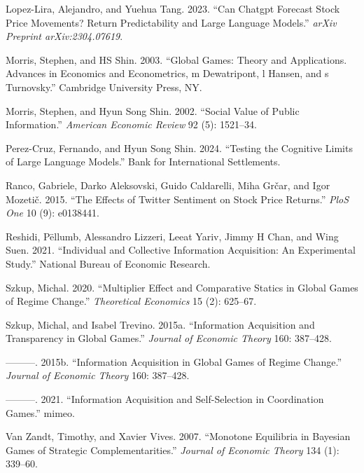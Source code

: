 \documentclass[
]{article}
\newlength{\cslhangindent}
\newenvironment{CSLReferences}[2] %
 {\begin{list}{}{%
  \setlength{\itemindent}{0pt}
  \setlength{\leftmargin}{0pt}
  \setlength{\parsep}{0pt}
  \ifodd #1
   \setlength{\leftmargin}{\cslhangindent}
   \setlength{\itemindent}{-1\cslhangindent}
  \fi
  \setlength{\itemsep}{#2\baselineskip}}}
 {\end{list}}
\theoremstyle{plain}
\theoremstyle{remark}
\begin{document}
\begin{CSLReferences}{1}{0}
Lopez-Lira, Alejandro, and Yuehua Tang. 2023. {``Can Chatgpt Forecast
Stock Price Movements? Return Predictability and Large Language
Models.''} \emph{arXiv Preprint arXiv:2304.07619}.

Morris, Stephen, and HS Shin. 2003. {``Global Games: Theory and
Applications. Advances in Economics and Econometrics, m Dewatripont, l
Hansen, and s Turnovsky.''} Cambridge University Press, NY.

Morris, Stephen, and Hyun Song Shin. 2002. {``Social Value of Public
Information.''} \emph{American Economic Review} 92 (5): 1521--34.

Perez-Cruz, Fernando, and Hyun Song Shin. 2024. {``Testing the Cognitive
Limits of Large Language Models.''} Bank for International Settlements.

Ranco, Gabriele, Darko Aleksovski, Guido Caldarelli, Miha Grčar, and
Igor Mozetič. 2015. {``The Effects of Twitter Sentiment on Stock Price
Returns.''} \emph{PloS One} 10 (9): e0138441.

Reshidi, Pëllumb, Alessandro Lizzeri, Leeat Yariv, Jimmy H Chan, and
Wing Suen. 2021. {``Individual and Collective Information Acquisition:
An Experimental Study.''} National Bureau of Economic Research.

Szkup, Michal. 2020. {``Multiplier Effect and Comparative Statics in
Global Games of Regime Change.''} \emph{Theoretical Economics} 15 (2):
625--67.

Szkup, Michal, and Isabel Trevino. 2015a. {``Information Acquisition and
Transparency in Global Games.''} \emph{Journal of Economic Theory} 160:
387--428.

---------. 2015b. {``Information Acquisition in Global Games of Regime
Change.''} \emph{Journal of Economic Theory} 160: 387--428.

---------. 2021. {``Information Acquisition and Self-Selection in
Coordination Games.''} mimeo.

Van Zandt, Timothy, and Xavier Vives. 2007. {``Monotone Equilibria in
Bayesian Games of Strategic Complementarities.''} \emph{Journal of
Economic Theory} 134 (1): 339--60.


\end{CSLReferences}
\end{document}
